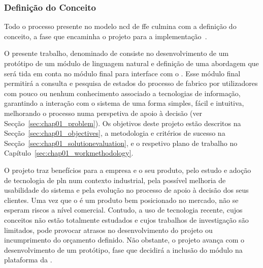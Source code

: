 \subsubsection*{Definição do Conceito}
Todo o processo presente no modelo \gls{ncd} de \gls{ffe} culmina com a definição do conceito, a fase que encaminha o projeto para a implementação~\parencite{ffe_effectivemethods_tools_techniques}.

O presente trabalho, denominado de  consiste no desenvolvimento de um protótipo de um módulo de linguagem natural e definição de uma abordagem que será tida em conta no módulo final para interface com o {\productname}. Esse módulo final permitirá a consulta e pesquisa de estados do processo de fabrico por utilizadores com pouco ou nenhum conhecimento associado a tecnologias de informação, garantindo a interação com o sistema de uma forma simples, fácil e intuitiva, melhorando o processo numa perspetiva de apoio à decisão (ver Secção~\ref{sec:chap01_problem}). Os objetivos deste projeto estão descritos na Secção~\ref{sec:chap01_objectives}, a metodologia e critérios de sucesso na Secção~\ref{sec:chap01_solutionevaluation}, e o respetivo plano de trabalho no Capítulo~\ref{sec:chap01_workmethodology}.

O projeto traz benefícios para a empresa e o seu produto, pelo estudo e adoção de tecnologia de \gls{pln} num contexto industrial, pela possível melhoria de usabilidade do sistema e pela evolução no processo de apoio à decisão dos seus clientes. Uma vez que o {\productname} é um produto bem posicionado no mercado, não se esperam riscos a nível comercial. Contudo, a uso de tecnologia recente, cujos conceitos não estão totalmente estudados e cujos trabalhos de investigação são limitados, pode provocar atrasos no desenvolvimento do projeto ou incumprimento do orçamento definido. Não obstante, o projeto avança com o desenvolvimento de um protótipo, fase que decidirá a inclusão do módulo na plataforma da {\companyname}.
